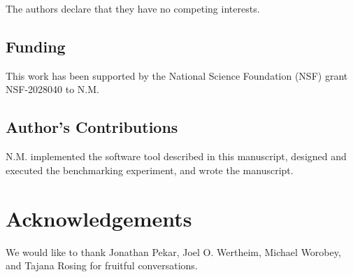 \documentclass[a4paper,num-refs,gigabyte]{oup-contemporary}
\begin{document}
The authors declare that they have no competing interests.

\subsection{Funding}

This work has been supported by the National Science Foundation (NSF) grant NSF-2028040 to N.M.


\subsection{Author's Contributions}

N.M. implemented the software tool described in this manuscript, designed and executed the benchmarking experiment, and wrote the manuscript.

\section{Acknowledgements}

We would like to thank Jonathan Pekar, Joel O. Wertheim, Michael Worobey, and Tajana Rosing for fruitful conversations.


\end{document}
